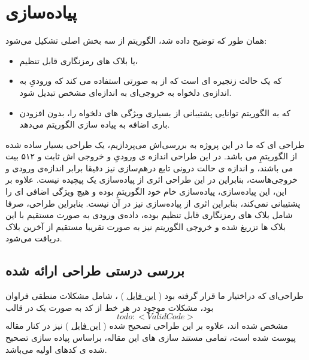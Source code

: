\pagebreak
\section{
	پیاده‌سازی
}
همان طور که توضیح داده شد، الگوریتم 
از سه بخش اصلی تشکیل می‌شود:
\begin{itemize}
	\item 
	یا بلاک های رمزنگاری قابل تنظیم،
	\item
که یک حالت زنجیره ای است که از
به صورتی استفاده می کند که ورودیِ ‌به اندازه‌ی دلخواه به خروجی‌ای به اندازه‌ای مشخص تبدیل شود.
\item
\textbf{ } 
که به الگوریتم توانایی پشتیبانی از بسیاری ویژگی های دلخواه را، بدون افزودن باری اضافه به پیاده سازی الگوریتم می‌دهد.

\end{itemize}

طراحی ای که ما در این پروژه به بررسی‌اش می‌پردازیم، یک طراحی بسیار ساده شده از الگوریتمِ
می باشد. در این طراحی اندازه ی ورودیِ و خروجی اش ثابت و ۵۱۲ بیت می باشند، و اندازه ی حالت درونی تابع درهم‌سازی نیز دقیقا برابر اندازه‌ی ورودی و خروجی‌هاست، بنابراین در این طراحی اثری از پیاده‌سازی یک 
 پیچیده نیست. علاوه‌ بر این، این پیاده‌سازی، پیاده‌سازی خام خود الگوریتمِ
 بوده و هیچ ویژگی اضافی ای را پشتیبانی نمی‌کند، بنابراین اثری از پیاده‌سازی 
نیز در آن نیست. بنابراین طراحی، صرفا شامل بلاک های رمزنگاری قابل تنظیم بوده، داده‌ی ورودی به صورت مستقیم با این بلاک ها تزریغ شده و خروجی الگوریتم نیز به صورت تقریبا مستقیم از آخرین بلاک دریافت می‌شود.

\subsection{
	بررسی درستی طراحی ارائه شده
}
طراحی‌ای که دراختیار ما قرار گرفته بود 
(
\href{https://github.com/VahidZee/SkeinHashingHDL/blob/master/SourceCode/Verilog/skein.v}{این فایل} 
)
، شامل مشکلات منطقی فراوان بود، مشکلات موجود در هر خط از کد 
به صورت یک 
در قالب 
$$todo: <Valid Code>$$
مشخص شده اند، علاوه بر این طراحی تصحیح شده 
(
\href{https://github.com/VahidZee/SkeinHashingHDL/blob/master/SourceCode/Verilog/corrected.v}{این فایل} 
)
نیز در کنار مقاله پیوست شده است، تمامی مستند سازی های این مقاله، براساس پیاده سازی تصحیح شده ی کدهای اولیه می‌باشد.
